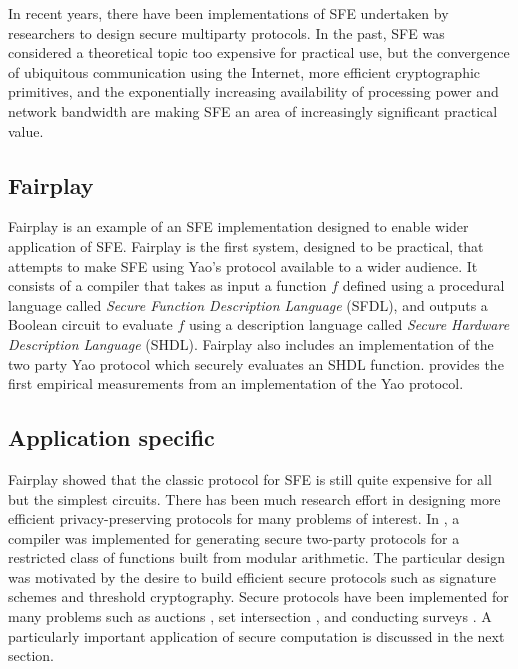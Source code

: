 In recent years, there have been implementations of SFE undertaken
by researchers to design secure multiparty protocols. In the past,
SFE was considered a theoretical topic too expensive for practical
use, but the convergence of ubiquitous communication using the Internet,
more efficient cryptographic primitives, and the exponentially increasing
availability of processing power and network bandwidth are making
SFE an area of increasingly significant practical value.


\subsection{Fairplay \label{sub:Fairplay}}

Fairplay \cite{Fairplay} is an example of an SFE implementation designed
to enable wider application of SFE. Fairplay is the first system,
designed to be practical, that attempts to make SFE using Yao's protocol
available to a wider audience. It consists of a compiler that takes
as input a function $f$ defined using a procedural language called
\emph{Secure Function Description Language} (SFDL), and outputs a
Boolean circuit to evaluate $f$ using a description language called
\emph{Secure Hardware Description Language} (SHDL). Fairplay also
includes an implementation of the two party Yao protocol which securely
evaluates an SHDL function. \cite{Fairplay} provides the first empirical
measurements from an implementation of the Yao protocol.


\subsection{Application specific}

Fairplay showed that the classic protocol for SFE is still quite expensive
for all but the simplest circuits. There has been much research effort
in designing more efficient privacy-preserving protocols for many
problems of interest. In \cite{Reiter:CCS:2003}, a compiler was implemented
for generating secure two-party protocols for a restricted class of
functions built from modular arithmetic. The particular design was
motivated by the desire to build efficient secure protocols such as
signature schemes and threshold cryptography. Secure protocols have
been implemented for many problems such as auctions \cite{NPS99},
set intersection \cite{FNP04}, and conducting surveys \cite{FNP04}.
A particularly important application of secure computation is discussed
in the next section.


